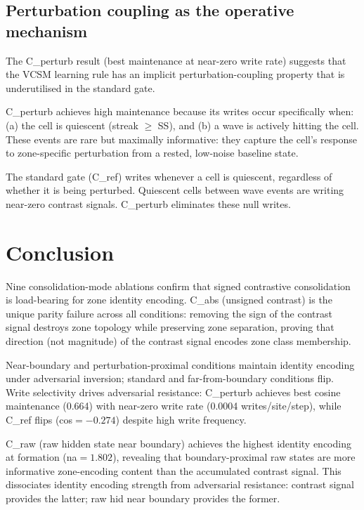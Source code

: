 \documentclass[11pt,a4paper]{article}
\begin{document}
\subsection{Perturbation coupling as the operative mechanism}

The C\_perturb result (best maintenance at near-zero write rate) suggests that
the VCSM learning rule has an implicit perturbation-coupling property that is
underutilised in the standard gate.

C\_perturb achieves high maintenance because its writes occur specifically when:
(a) the cell is quiescent (streak $\geq$ SS), and
(b) a wave is actively hitting the cell.
These events are rare but maximally informative: they capture the cell's response
to zone-specific perturbation from a rested, low-noise baseline state.

The standard gate (C\_ref) writes whenever a cell is quiescent,
regardless of whether it is being perturbed.
Quiescent cells between wave events are writing near-zero contrast signals.
C\_perturb eliminates these null writes.

\section{Conclusion}

Nine consolidation-mode ablations confirm that signed contrastive consolidation
is load-bearing for zone identity encoding.
C\_abs (unsigned contrast) is the unique parity failure across all conditions:
removing the sign of the contrast signal destroys zone topology while preserving
zone separation, proving that direction (not magnitude) of the contrast signal
encodes zone class membership.

Near-boundary and perturbation-proximal conditions maintain identity encoding
under adversarial inversion; standard and far-from-boundary conditions flip.
Write selectivity drives adversarial resistance: C\_perturb achieves best
cosine maintenance (0.664) with near-zero write rate (0.0004 writes/site/step),
while C\_ref flips (cos$=-0.274$) despite high write frequency.

C\_raw (raw hidden state near boundary) achieves the highest identity encoding
at formation (na$=1.802$), revealing that boundary-proximal raw states are more
informative zone-encoding content than the accumulated contrast signal.
This dissociates identity encoding strength from adversarial resistance:
contrast signal provides the latter; raw hid near boundary provides the former.
\end{document}
